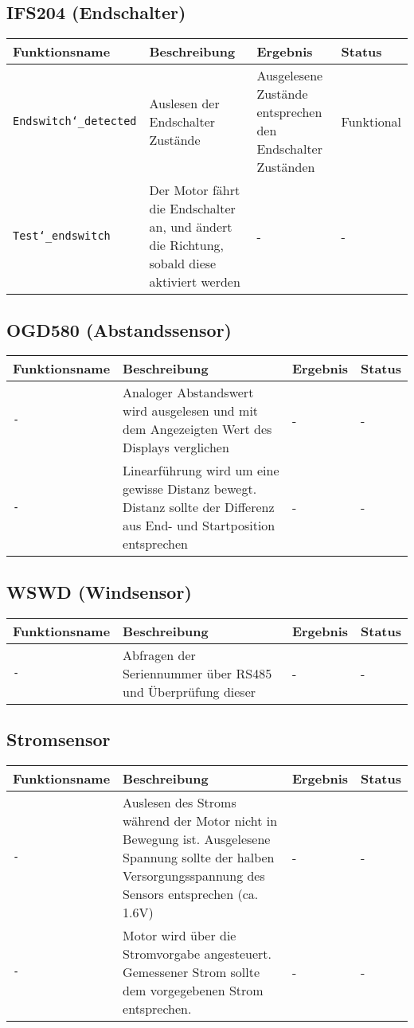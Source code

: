 \documentclass{article}
\begin{document}
	\subsection{IFS204 (Endschalter)}
		\begin{tabular}{|p{3.2cm}|p{5.5cm}|p{4cm}| p{1.6cm} |}
			\hline
				\textbf{Funktionsname} & \textbf{Beschreibung} & \textbf{Ergebnis} & \textbf{Status} \\
			\hline
				 \texttt{Endswitch\char`_detected} & Auslesen der Endschalter Zustände & Ausgelesene Zustände entsprechen den Endschalter Zuständen & Funktional \\
			\hline
				\texttt{Test\char`_endswitch} & Der Motor fährt die Endschalter an, und ändert die Richtung, sobald diese aktiviert werden & - & - \\
			 \hline
		\end{tabular}
	\subsection{OGD580 (Abstandssensor)}
		\begin{tabular}{|p{3.2cm}|p{5.5cm}|p{4cm}| p{1.6cm} |}
			\hline
				\textbf{Funktionsname} & \textbf{Beschreibung} & \textbf{Ergebnis} & \textbf{Status} \\
			\hline
				\texttt{-} & Analoger Abstandswert wird ausgelesen und mit dem Angezeigten Wert des Displays verglichen & - & - \\
			\hline
				\texttt{-} & Linearführung wird um eine gewisse Distanz bewegt. Distanz sollte der Differenz aus End- und Startposition entsprechen & - & - \\
			\hline
		\end{tabular}
	\subsection{WSWD (Windsensor)}
		\begin{tabular}{|p{3.2cm}|p{5.5cm}|p{4cm}| p{1.6cm} |}
			\hline
				\textbf{Funktionsname} & \textbf{Beschreibung} & \textbf{Ergebnis} & \textbf{Status} \\
			\hline
				\texttt{-} & Abfragen der Seriennummer über RS485 und Überprüfung dieser & - & - \\
			\hline
		\end{tabular}
	\subsection{Stromsensor}
		\begin{tabular}{|p{3.2cm}|p{5.5cm}|p{4cm}| p{1.6cm} |}
			\hline
				\textbf{Funktionsname} & \textbf{Beschreibung} & \textbf{Ergebnis} & \textbf{Status} \\
			\hline
				\texttt{-} & Auslesen des Stroms während der Motor nicht in Bewegung ist. Ausgelesene Spannung sollte der halben Versorgungsspannung des Sensors entsprechen (ca. 1.6V) & - & - \\
			\hline
				\texttt{-} & Motor wird über die Stromvorgabe angesteuert. Gemessener Strom sollte dem vorgegebenen Strom entsprechen. & - & - \\
			\hline
		\end{tabular} 
\end{document}
